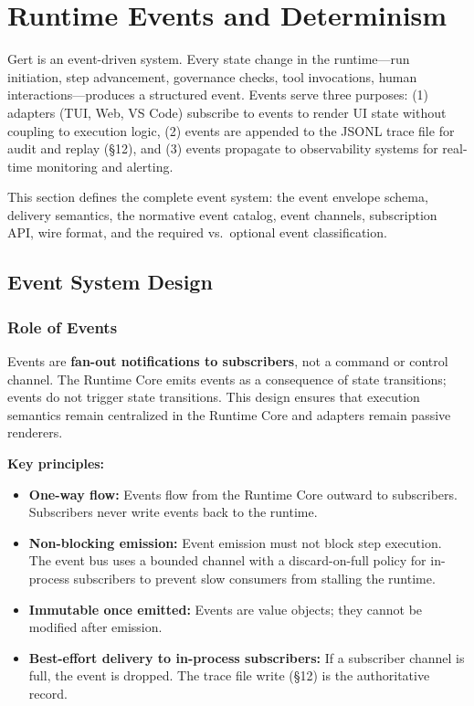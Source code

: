 \chapter{Runtime Events and Determinism}
\label{ch:events}

Gert is an event-driven system. Every state change in the runtime---run initiation, step advancement, governance checks, tool invocations, human interactions---produces a structured event. Events serve three purposes: (1) adapters (TUI, Web, VS Code) subscribe to events to render UI state without coupling to execution logic, (2) events are appended to the JSONL trace file for audit and replay (§12), and (3) events propagate to observability systems for real-time monitoring and alerting.

This section defines the complete event system: the event envelope schema, delivery semantics, the normative event catalog, event channels, subscription API, wire format, and the required vs.\ optional event classification.

\section{Event System Design}

\subsection{Role of Events}

Events are \textbf{fan-out notifications to subscribers}, not a command or control channel. The Runtime Core emits events as a consequence of state transitions; events do not trigger state transitions. This design ensures that execution semantics remain centralized in the Runtime Core and adapters remain passive renderers.

\textbf{Key principles:}
\begin{itemize}
  \item \textbf{One-way flow:} Events flow from the Runtime Core outward to subscribers. Subscribers never write events back to the runtime.
  \item \textbf{Non-blocking emission:} Event emission must not block step execution. The event bus uses a bounded channel with a discard-on-full policy for in-process subscribers to prevent slow consumers from stalling the runtime.
  \item \textbf{Immutable once emitted:} Events are value objects; they cannot be modified after emission.
  \item \textbf{Best-effort delivery to in-process subscribers:} If a subscriber channel is full, the event is dropped. The trace file write (§12) is the authoritative record.
\end{itemize}

